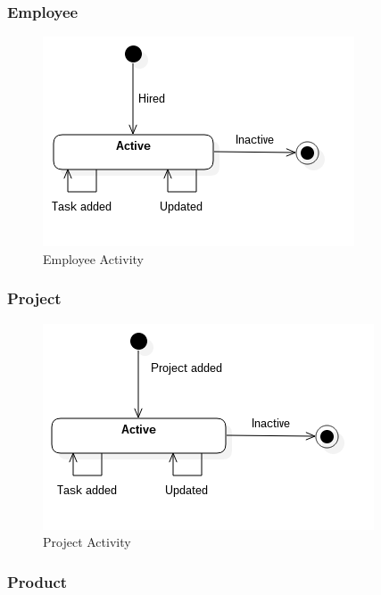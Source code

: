 \subsubsection*{Employee}

\begin{figure}[H]
    \centering
    \includegraphics[scale=0.7]{Images/ProblemDomain/employeeActivityDiagram.png}
    \caption{Employee Activity}
    \label{fig:employeeActivityDiagram}
\end{figure}

\subsubsection*{Project}

\begin{figure}[H]
    \centering
    \includegraphics[scale=0.7]{Images/ProblemDomain/projectActivityDiagram.png}
    \caption{Project Activity}
    \label{fig:projectActivityDiagram}
\end{figure}

\subsubsection*{Product}

